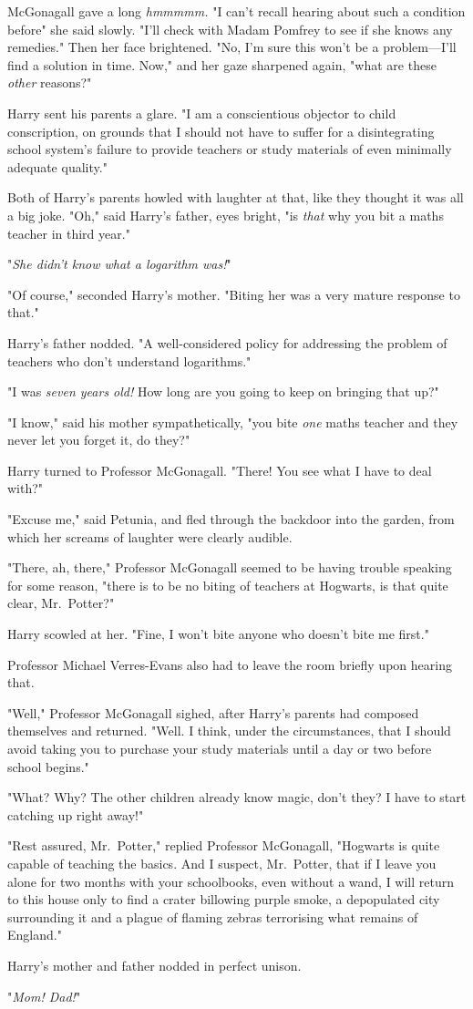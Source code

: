 McGonagall gave a long \emph{hmmmmm.} "I can't recall hearing about such a
condition before{\el}" she said slowly. "I'll check with Madam Pomfrey to
see if she knows any remedies." Then her face brightened. "No, I'm sure this
won't be a problem---I'll find a solution in time. Now," and her gaze sharpened
again, "what are these \emph{other} reasons?"

Harry sent his parents a glare. "I am a conscientious objector to child
conscription, on grounds that I should not have to suffer for a disintegrating
school system's failure to provide teachers or study materials of even
minimally adequate quality."

Both of Harry's parents howled with laughter at that, like they thought it was
all a big joke. "Oh," said Harry's father, eyes bright, "is \emph{that} why you
bit a maths teacher in third year."

"\emph{She didn't know what a logarithm was!}"

"Of course," seconded Harry's mother. "Biting her was a very mature response to
that."

Harry's father nodded. "A well-considered policy for addressing the problem of
teachers who don't understand logarithms."

"I was \emph{seven years old!} How long are you going to keep on bringing that
up?"

"I know," said his mother sympathetically, "you bite \emph{one} maths teacher
and they never let you forget it, do they?"

Harry turned to Professor McGonagall. "There! You see what I have to deal with?"

"Excuse me," said Petunia, and fled through the backdoor into the garden, from
which her screams of laughter were clearly audible.

"There, ah, there," Professor McGonagall seemed to be having trouble speaking
for some reason, "there is to be no biting of teachers at Hogwarts, is that
quite clear, Mr.~Potter?"

Harry scowled at her. "Fine, I won't bite anyone who doesn't bite me first."

Professor Michael Verres-Evans also had to leave the room briefly upon hearing
that.

"Well," Professor McGonagall sighed, after Harry's parents had composed
themselves and returned. "Well. I think, under the circumstances, that I should
avoid taking you to purchase your study materials until a day or two before
school begins."

"What? Why? The other children already know magic, don't they? I have to start
catching up right away!"

"Rest assured, Mr.~Potter," replied Professor McGonagall, "Hogwarts is quite
capable of teaching the basics. And I suspect, Mr.~Potter, that if I leave you
alone for two months with your schoolbooks, even without a wand, I will return
to this house only to find a crater billowing purple smoke, a depopulated city
surrounding it and a plague of flaming zebras terrorising what remains of
England."

Harry's mother and father nodded in perfect unison.

"\emph{Mom! Dad!}"
